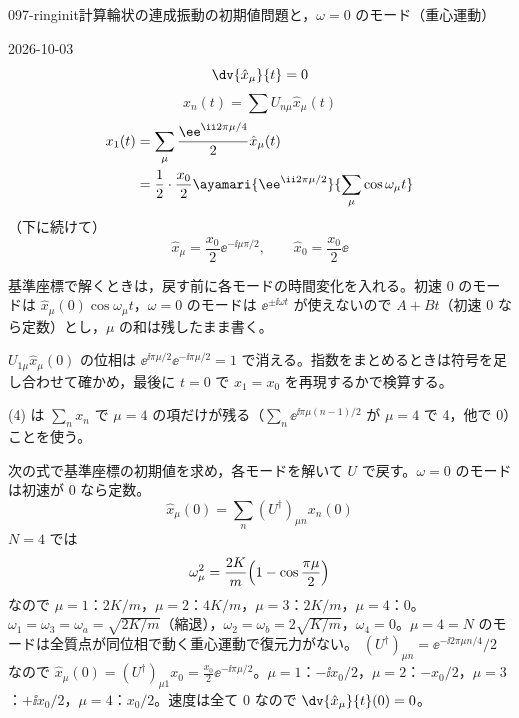 \documentclass[uplatex,dvipdfmx,a4paper,11pt]{jsarticle}
\begin{document}
\begin{mondai}{097-ringinit}{計算}{輪状の連成振動の初期値問題と，$\omega=0$ のモード（重心運動）}
\begin{kotaeutsushi}{2026-10-03}
\[ \dv{\hat{x}_\mu}{t}=0 \]
\[ x_n(t)=\sum U_{n\mu}\hat{x}_\mu(t) \]
\begin{align*}
  x_1(t)&=\sum_\mu\frac{\ee^{\ii2\pi\mu/4}}{2}\hat{x}_\mu(t)\\
  &=\frac{1}{2}\cdot\frac{x_0}{2}\ayamari{\ee^{\ii2\pi\mu/2}}{\sum_\mu\cos\omega_\mu t}
\end{align*}
（下に続けて）
\[ \hat{x}_\mu=\frac{x_0}{2}\ee^{-\ii\mu\pi/2},\qquad\hat{x}_0=\frac{x_0}{2}\ee \]
\mikai
\end{kotaeutsushi}
\begin{kizuki}
\item 基準座標で解くときは，戻す前に各モードの時間変化を入れる。初速 0 のモードは $\hat{x}_\mu(0)\cos\omega_\mu t$，$\omega=0$ のモードは $\ee^{\pm\ii\omega t}$ が使えないので $A+Bt$（初速 0 なら定数）とし，$\mu$ の和は残したまま書く。
\item $U_{1\mu}\hat{x}_\mu(0)$ の位相は $\ee^{\ii\pi\mu/2}\ee^{-\ii\pi\mu/2}=1$ で消える。指数をまとめるときは符号を足し合わせて確かめ，最後に $t=0$ で $x_1=x_0$ を再現するかで検算する。
\item (4) は $\sum_nx_n$ で $\mu=4$ の項だけが残る（$\sum_n\ee^{\ii\pi\mu(n-1)/2}$ が $\mu=4$ で 4，他で 0）ことを使う。
\end{kizuki}
\begin{tadashii}
\houshin 次の式で基準座標の初期値を求め，各モードを解いて $U$ で戻す。$\omega=0$ のモードは初速が 0 なら定数。
\[ \hat{x}_\mu(0)=\sum_n(U^{\dagger})_{\mu n}x_n(0) \]
\keisan
{} $N=4$ では
\[ \omega_\mu^{2}=\frac{2K}{m}\Bigl(1-\cos\frac{\pi\mu}{2}\Bigr) \]
なので $\mu=1$：$2K/m$，$\mu=2$：$4K/m$，$\mu=3$：$2K/m$，$\mu=4$：$0$。$\omega_1=\omega_3=\omega_a=\sqrt{2K/m}$（縮退），$\omega_2=\omega_b=2\sqrt{K/m}$，$\omega_4=0$。$\mu=4=N$ のモードは全質点が同位相で動く重心運動で復元力がない。
 $(U^{\dagger})_{\mu n}=\ee^{-\ii2\pi\mu n/4}/2$ なので $\hat{x}_\mu(0)=(U^{\dagger})_{\mu1}x_0=\frac{x_0}{2}\ee^{-\ii\pi\mu/2}$。$\mu=1$：$-\ii x_0/2$，$\mu=2$：$-x_0/2$，$\mu=3$：$+\ii x_0/2$，$\mu=4$：$x_0/2$。速度は全て 0 なので $\dv{\hat{x}_\mu}{t}(0)=0$。

\end{tadashii}
\end{mondai}
\end{document}
